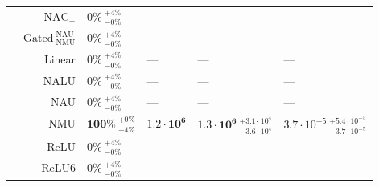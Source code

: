 \begin{longtable}{crllll}
\nopagebreak
 & $\mathrm{NAC}_{+}$ & $0\% {~}^{+4\%}_{-0\%}$ & --- & --- & ---\\

\nopagebreak
 & $\mathrm{Gated~}^{\mathrm{NAU}}_{\mathrm{NMU}}$ & $0\% {~}^{+4\%}_{-0\%}$ & --- & --- & ---\\

\nopagebreak
 & Linear & $0\% {~}^{+4\%}_{-0\%}$ & --- & --- & ---\\

\nopagebreak
 & NALU & $0\% {~}^{+4\%}_{-0\%}$ & --- & --- & ---\\

\nopagebreak
 & NAU & $0\% {~}^{+4\%}_{-0\%}$ & --- & --- & ---\\

\nopagebreak
 & NMU & $\mathbf{100\%} {~}^{+0\%}_{-4\%}$ & $\mathbf{1.2 \cdot 10^{6}}$ & $\mathbf{1.3 \cdot 10^{6}} {~}^{+3.1 \cdot 10^{4}}_{-3.6 \cdot 10^{4}}$ & $3.7 \cdot 10^{-5} {~}^{+5.4 \cdot 10^{-5}}_{-3.7 \cdot 10^{-5}}$\\

\nopagebreak
 & ReLU & $0\% {~}^{+4\%}_{-0\%}$ & --- & --- & ---\\

\nopagebreak
\multirow{-11}{*}{\centering\arraybackslash $z^2$} & ReLU6 & $0\% {~}^{+4\%}_{-0\%}$ & --- & --- & ---\\*
\end{longtable}